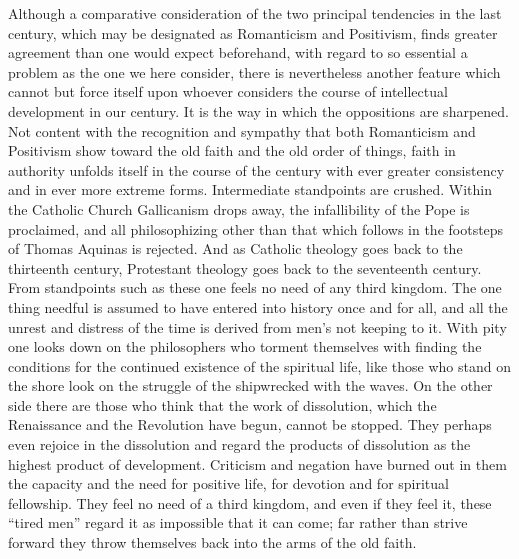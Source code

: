 \documentclass[12pt,a4paper,openany]{book}
\newcommand{\opage}[1]{\marginnote{\footnotesize\textit{[#1]}}}
\begin{document}
\opage{237}Although a comparative consideration of the two
principal tendencies in the last century, which may be designated as
Romanticism and Positivism, finds greater agreement
than one would expect beforehand, with regard to so
essential a problem as the one we here consider, there is
nevertheless another feature which cannot but force itself upon
whoever considers the course of intellectual development in our
century. It is the way in which the oppositions
are sharpened. Not content with the recognition and sympathy
that both Romanticism and Positivism show toward
the old faith and the old order of things, faith in authority
unfolds itself in the course of the century with ever greater
consistency and in ever more extreme forms.
Intermediate standpoints are crushed. Within the Catholic Church
Gallicanism drops away, the infallibility of the Pope is proclaimed, and all
philosophizing other than that which follows in the footsteps of Thomas Aquinas
is rejected. And as Catholic theology goes
back to the thirteenth century, Protestant
theology goes back to the seventeenth century. From standpoints such as
these one feels no need of any third kingdom. The one thing
needful is assumed to have entered into history once and for
all, and all the unrest and distress of the time is derived from men's not
keeping to it. With pity one looks down on
the philosophers who torment themselves with finding the conditions for the
continued existence of the spiritual life, like those who stand on the shore look
on the struggle of the shipwrecked with the waves. On the other
side there are those who think that the work of dissolution, which
the Renaissance and the Revolution have begun, cannot be stopped. They
perhaps even rejoice in the dissolution and regard
the products of dissolution as the highest product of development. Criticism and
negation have burned out in them the capacity and the need for
positive life, for devotion and for spiritual fellowship. They
feel no need of a third kingdom, and even if they feel it,
these ``tired men'' regard it as impossible that it can
come; far rather than strive forward they throw themselves back
into the arms of the old faith.
\end{document}
